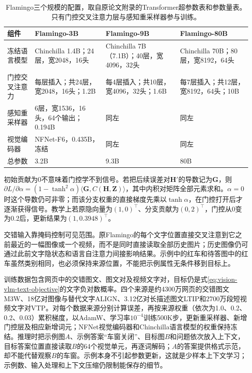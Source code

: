 \begin{table}[htbp]
  \centering
  \small
  \begin{tabularx}{\linewidth}{@{}p{16mm}XXX@{}}
    \toprule
    组件 & Flamingo-3B & Flamingo-9B & Flamingo-80B\\
    \midrule
    冻结语言模型 & Chinchilla 1.4B；24层，宽2048，16头 & Chinchilla 7B（7.1B）；40层，宽4096，32头 & Chinchilla 70B；80层，宽8192，64头\\
    门控交叉注意力 & 每层插入；共24层，宽2048，16头；1.2B & 每4层插入；共10层，宽4096，32头；1.6B & 每7层插入；共12层，宽8192，64头；10B\\
    感知重采样器 & 6层，宽1536，16头，64个输出；0.194B & 同左 & 同左\\
    视觉编码器 & NFNet-F6，0.435B，冻结 & 同左 & 同左\\
    总参数 & 3.2B & 9.3B & 80B\\
    \bottomrule
  \end{tabularx}
  \caption{Flamingo三个规模的配置，取自原论文附录的Transformer超参数表和参数量表。只有门控交叉注意力层与感知重采样器参与训练。}
  \label{tab:vision-models-flamingo-config}
\end{table}

初始贡献为0不意味着门控学不到信号。若把后续误差对$\bm H'$的导数记为$\bm G$，则$\partial L/\partial\alpha=(1-\tanh^2\alpha)\langle\bm G,C(\bm H,\bm Z)\rangle$，其中内积对矩阵全部元素求和。$\alpha=0$时这个导数仍可非零；而该分支权重的直接梯度先乘以$\tanh\alpha$，在门控打开后才逐渐获得信号。教学上若原隐向量为$(1,0)^\top$、分支贡献为$(0,2)^\top$，门控从0变为0.2后，更新结果为$(1,0.3948)^\top$。

交错输入靠掩码控制可见范围。原Flamingo的每个文字位置直接交叉注意到它之前最近的一幅图像或一个视频，而不是同时直接读取全部历史图片；历史图像仍可通过此前文字隐状态和语言自注意力间接影响结果。示例中的红车和待答图中的红车虽然类别相同，也必须保持来源位置，不能把示例属性无条件移到目标上。

训练数据包含网页中的交错图文、图文对及视频文字对，目标仍是式\eqref{eq:vision-vlm-text-objective}的文字负对数概率。四个来源是约4300万网页的交错图文M3W、18亿对图像与替代文字ALIGN、3.12亿对长描述图文LTIP和2700万段短视频文字对VTP。对每个数据来源分别计算误差，再按来源权重（依次为1.0、0.2、0.2、0.03）累积梯度，以AdamW、学习率$10^{-4}$训练500K步，更新重采样器、新增门控层及相应新增词元；NFNet视觉编码器和Chinchilla语言模型的权重保持冻结。推理时把示例图$A$、示例答案“车窗关闭”、目标图$B$和问题依次放入上下文，目标答案位置直接读取$B$的64个视觉单元，再逐词解码；$A$的答案提供格式示范，却不能代替观察$B$的车窗。示例本身不引起参数更新，这就是少样本上下文学习；示例数、输入处理和上下文压缩仍限制能保存的细节。

